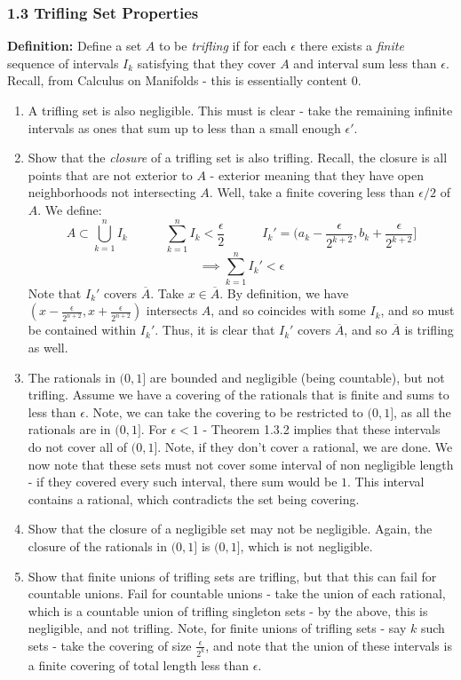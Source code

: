 \documentclass[12pt,a4paper]{article}
\newcommand{\1}[1]{\mathbbm{1}\left\{ #1 \right\}}
\begin{document}
\subsubsection{1.3 Trifling Set Properties} \textbf{Definition:} Define a set $A$ to be \textit{trifling} if for each $\epsilon$ there exists a \textit{finite} sequence of intervals $I_k$ satisfying that they cover $A$ and interval sum less than $\epsilon$. Recall, from Calculus on Manifolds - this is essentially content $0$. 
\begin{enumerate}
	\item A trifling set is also negligible. This must is clear - take the remaining infinite intervals as ones that sum up to less than a small enough $\epsilon'$.
	
	\item Show that the \textit{closure} of a trifling set is also trifling. Recall, the closure is all points that are not exterior to $A$ - exterior meaning that they have open neighborhoods not intersecting $A$. Well, take a finite covering less than $\epsilon/2$ of $A$. We define:
	$$
		A \subset \bigcup_{k=1}^n I_k \quad\quad\quad \sum_{k=1}^n I_k < \frac{\epsilon}{2} \quad\quad\quad
		I_k' = \bigg(a_k - \frac{\epsilon}{2^{k+2}}, b_k + \frac{\epsilon}{2^{k+2}}\bigg]
	$$
	$$
		\implies \sum_{k=1}^n I_k' < \epsilon
	$$
	Note that $I_k'$ covers $\overline{A}$. Take $x \in \overline{A}$. By definition, we have $\left(x - \frac{\epsilon}{2^{n+2}}, x + \frac{\epsilon}{2^{n+2}}\right)$ intersects $A$, and so coincides with some $I_k$, and so must be contained within $I_k'$. Thus, it is clear that $I_k'$ covers $\overline{A}$, and so $\overline{A}$ is trifling as well.
	
	\item The rationals in $(0,1]$ are bounded and negligible (being countable), but not trifling. Assume we have a covering of the rationals that is finite and sums to less than $\epsilon$. Note, we can take the covering to be restricted to $(0,1]$, as all the rationals are in $(0,1]$. For $\epsilon < 1$ - Theorem 1.3.2 implies that these intervals do not cover all of $(0,1]$. Note, if they don't cover a rational, we are done. We now note that these sets must not cover some interval of non negligible length - if they covered every such interval, there sum would be $1$. This interval contains a rational, which contradicts the set being covering.
	
	\item Show that the closure of a negligible set may not be negligible. Again, the closure of the rationals in $(0,1]$ is $(0,1]$, which is not negligible.
	
	\item Show that finite unions of trifling sets are trifling, but that this can fail for countable unions. Fail for countable unions - take the union of each rational, which is a countable union of trifling singleton sets - by the above, this is negligible, and not trifling. Note, for finite unions of trifling sets - say $k$ such sets - take the covering of size $\frac{\epsilon}{2^k}$, and note that the union of these intervals is a finite covering of total length less than $\epsilon$.
\end{enumerate}
\end{document}
